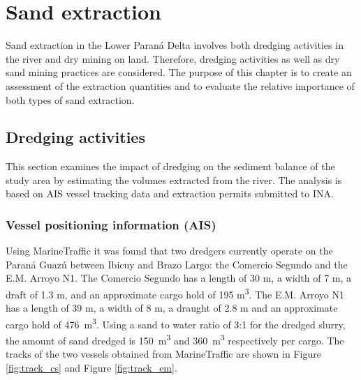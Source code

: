 \chapter{Sand extraction}
\label{chap:sand extraction}
Sand extraction in the Lower Paraná Delta involves both dredging activities in the river and dry mining on land. Therefore, dredging activities as well as dry sand mining practices are considered. The purpose of this chapter is to create an assessment of the extraction quantities and to evaluate the relative importance of both types of sand extraction. 

\section{Dredging activities}
\label{sec: Dredging activities}
This section examines the impact of dredging on the sediment balance of the study area by estimating the volumes extracted from the river. The analysis is based on AIS vessel tracking data and extraction permits submitted to INA.

\subsection{Vessel positioning information (AIS)}
Using MarineTraffic it was found that two dredgers currently operate on the Paraná Guazú between Ibicuy and Brazo Largo: the Comercio Segundo and the E.M. Arroyo N1. The Comercio Segundo has a length of 30 m, a width of 7 m, a draft of 1.3 m, and an approximate cargo hold of 195 m\textsuperscript{3}. The E.M. Arroyo N1 has a length of 39 m, a width of 8 m, a draught of 2.8 m and an approximate cargo hold of 476 \,m\textsuperscript{3}. Using a sand to water ratio of 3:1 for the dredged slurry, the amount of sand dredged is 150 \,m\textsuperscript{3} and 360 \,m\textsuperscript{3} respectively per cargo. The tracks of the two vessels obtained from MarineTraffic are shown in Figure \ref{fig:track_cs} and Figure \ref{fig:track_em}.

